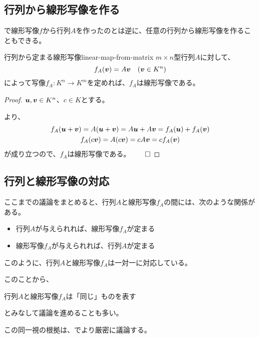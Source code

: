\documentclass[../../../topic_linear-algebra]{subfiles}
\begin{document}
\subsection{行列から線形写像を作る}

で線形写像$f$から行列$A$を作ったのとは逆に、任意の行列から線形写像を作ることもできる。

\begin{theorem}{行列から定まる線形写像}{linear-map-from-matrix}
  $m \times n$型行列$A$に対して、
  \begin{equation*}
    f_A(\vb*{v}) = A\vb*{v} \quad (\vb*{v} \in K^n)
  \end{equation*}
  によって写像$f_A\colon K^n \to K^m$を定めれば、$f_A$は線形写像である。
\end{theorem}

\begin{proof}
  $\vb*{u}, \vb*{v} \in K^n$、$c \in K$とする。
  
  より、
  \begin{gather*}
    f_A(\vb*{u} + \vb*{v}) = A(\vb*{u} + \vb*{v}) = A\vb*{u} + A\vb*{v} = f_A(\vb*{u}) + f_A(\vb*{v}) \\
    f_A(c\vb*{v}) = A(c\vb*{v}) = cA\vb*{v} = cf_A(\vb*{v})
  \end{gather*}
  が成り立つので、$f_A$は線形写像である。$\qed$
\end{proof}

\subsection{行列と線形写像の対応}

ここまでの議論をまとめると、行列$A$と線形写像$f_A$の間には、次のような関係がある。

\begin{itemize}
  \item 行列$A$が与えられれば、線形写像$f_A$が定まる
  \item 線形写像$f_A$が与えられれば、行列$A$が定まる
\end{itemize}

このように、行列$A$と線形写像$f_A$は一対一に対応している。

このことから、
\begin{emphabox}
  \begin{spacebox}
    \begin{center}
      行列$A$と線形写像$f_A$は「同じ」ものを表す
    \end{center}
  \end{spacebox}
\end{emphabox}
とみなして議論を進めることも多い。

\br

この同一視の根拠は、でより厳密に議論する。
\end{document}
